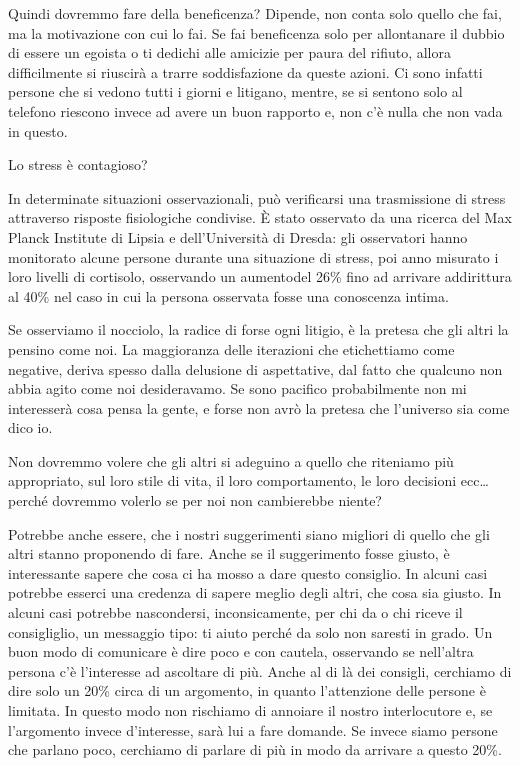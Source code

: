 \documentclass[12pt]{book} %
\begin{document}
Quindi dovremmo fare della beneficenza? Dipende, non conta solo quello che fai, ma la motivazione con cui lo fai. Se fai beneficenza solo per allontanare il
dubbio di essere un egoista o ti dedichi alle amicizie per paura del rifiuto, allora difficilmente si riuscirà a trarre soddisfazione da queste azioni. Ci sono infatti persone che si vedono tutti i giorni e litigano, mentre, se si sentono solo al telefono riescono invece ad avere un buon rapporto e, non c'è nulla che non vada in questo.

\begin{mdframed}[linewidth=1pt]
Lo stress è contagioso?

In determinate situazioni osservazionali, può verificarsi una trasmissione di stress attraverso risposte fisiologiche condivise. È stato osservato da una ricerca del Max Planck Institute di Lipsia e dell'Università di Dresda: gli osservatori hanno monitorato alcune persone durante una situazione di stress, poi anno misurato i loro livelli di cortisolo, osservando un aumentodel 26\% fino ad arrivare addirittura al 40\% nel caso in cui la persona osservata fosse una conoscenza intima.
\end{mdframed}

Se osserviamo il nocciolo, la radice di forse ogni litigio, è la pretesa che gli altri la pensino come noi.
La maggioranza delle iterazioni che etichettiamo come negative, deriva spesso dalla delusione di aspettative, dal fatto che qualcuno non abbia agito come noi desideravamo. Se sono pacifico probabilmente non mi interesserà cosa pensa la gente, e forse non avrò la pretesa che l'universo sia come dico io.

Non dovremmo volere che gli altri si adeguino a quello che
riteniamo più appropriato, sul loro stile di vita, il loro comportamento, le loro decisioni ecc… perché dovremmo
volerlo se per noi non cambierebbe niente? 

Potrebbe anche essere, che i nostri suggerimenti siano migliori di quello che gli altri stanno proponendo di fare. Anche se il suggerimento fosse giusto, è interessante sapere che cosa ci ha mosso a dare questo consiglio. In alcuni casi potrebbe esserci una credenza di sapere meglio degli altri, che cosa sia giusto. In alcuni casi potrebbe nascondersi, inconsicamente, per chi da o chi riceve il consigliglio, un messaggio tipo: ti aiuto perché da solo non saresti in grado.
Un buon modo di comunicare è dire poco e con cautela, osservando se nell'altra persona c'è l'interesse ad ascoltare di più.
Anche al di là dei consigli, cerchiamo di dire solo un 20\% circa di un argomento, in quanto l'attenzione delle persone è limitata. In questo modo non rischiamo di annoiare il nostro interlocutore e, se l'argomento invece d'interesse, sarà lui a fare domande. Se invece siamo persone che parlano poco, cerchiamo di parlare di più in modo da arrivare a questo 20\%.
\end{document}
